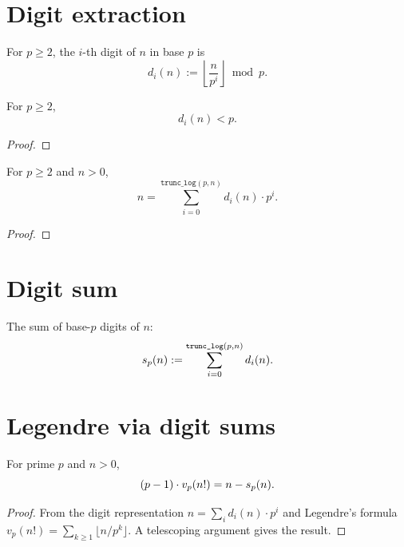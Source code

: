 
\section{Digit extraction}

\begin{definition}
  \label{def:digit}
  \rocqok
  For $p \geq 2$, the $i$-th digit of $n$ in base $p$ is
  \[
    d_i(n) := \left\lfloor \frac{n}{p^i} \right\rfloor \bmod p.
  \]
\end{definition}

\begin{lemma}
  \label{lem:digit_bound}
  \rocqok
  For $p \geq 2$,
  \[
    d_i(n) < p.
  \]
  \begin{proof}
    \rocqok
  \end{proof}
\end{lemma}

\begin{lemma}
  \label{lem:digits_repr}
  \rocqok
  For $p \geq 2$ and $n > 0$,
  \[
    n = \sum_{i=0}^{\texttt{trunc\_log}(p,n)} d_i(n) \cdot p^i.
  \]
  \begin{proof}
    \rocqok
  \end{proof}
\end{lemma}

\section{Digit sum}

\begin{definition}
  \label{def:digit_sum}
  \rocqok
  The sum of base-$p$ digits of $n$:
  \[
    s_p(n) := \sum_{i=0}^{\texttt{trunc\_log}(p,n)} d_i(n).
  \]
\end{definition}

\section{Legendre via digit sums}

\begin{lemma}
  \label{lem:legendre_digit_sum}
  \rocqok
  For prime $p$ and $n > 0$,
  \[
    (p-1) \cdot v_p(n!) = n - s_p(n).
  \]
  \begin{proof}
    \rocqok
    From the digit representation $n = \sum_i d_i(n) \cdot p^i$
    and Legendre's formula $v_p(n!) = \sum_{k \geq 1} \lfloor n/p^k \rfloor$.
    A telescoping argument gives the result.
  \end{proof}
\end{lemma}


